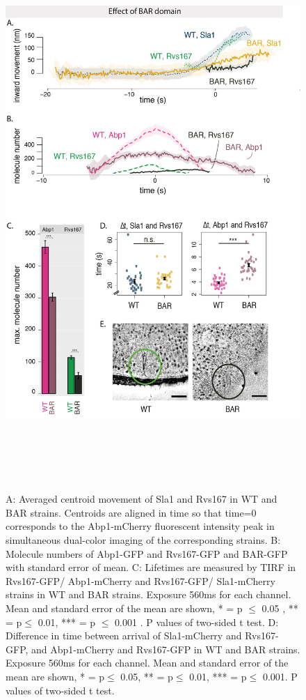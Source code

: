 \begin{figure}
	\centering
\includegraphics[width=21cm,height=21cm,keepaspectratio]{figures/results_final/delsh3_6}
	\caption [Effect of the Rvs167 SH3 deletion]
	{A: Averaged centroid movement of Sla1 and Rvs167 in WT and BAR strains. Centroids are aligned in time so that time=0 corresponds to the Abp1-mCherry fluorescent intensity peak in simultaneous dual-color imaging of the corresponding strains. 
	B: Molecule numbers of Abp1-GFP and Rvs167-GFP and BAR-GFP with standard error of mean. 
	C: Lifetimes are measured by TIRF in Rvs167-GFP/ Abp1-mCherry and Rvs167-GFP/ Sla1-mCherry strains in WT and BAR strains. Exposure 560ms for each channel. Mean and standard error of the mean are shown, * = p $\leq$ 0.05 , ** = p$\leq$ 0.01, *** = p $\leq$ 0.001 . P values of two-sided t test. 
	D: Difference in time between arrival of Sla1-mCherry and Rvs167-GFP, and Abp1-mCherry and Rvs167-GFP in WT and BAR strains. Exposure 560ms for each channel. Mean and standard error of the mean are shown, * = p$\leq$ 0.05, ** = p$\leq$ 0.01, *** = p$\leq$ 0.001. P values of two-sided t test.\label{fig2_sh3del}}
	\end{figure}
	\vspace{5mm}
	
